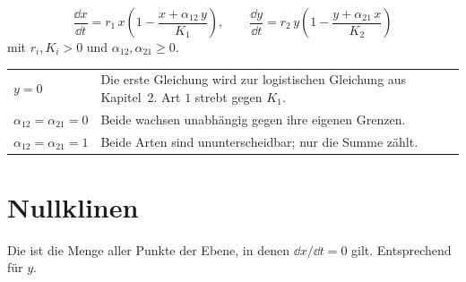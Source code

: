 \begin{definition}
\[ \frac{\dd x}{\dd t} = r_1\,x\left(1 - \frac{x + \alpha_{12}\,y}{K_1}\right), \qquad \frac{\dd y}{\dd t} = r_2\,y\left(1 - \frac{y + \alpha_{21}\,x}{K_2}\right) \]
mit $r_i, K_i > 0$ und $\alpha_{12}, \alpha_{21} \ge 0$.
\end{definition}

\begin{merksatz}
\begin{center}
{\small
\renewcommand{\arraystretch}{1.5}
\begin{tabular}{@{}P{2.6cm}P{6.0cm}@{}}
\toprule
$y = 0$ & Die erste Gleichung wird zur logistischen Gleichung aus Kapitel~2. Art $1$ strebt gegen $K_1$.\\
$\alpha_{12} = \alpha_{21} = 0$ & Beide wachsen unabhängig gegen ihre eigenen Grenzen.\\
$\alpha_{12} = \alpha_{21} = 1$ & Beide Arten sind ununterscheidbar; nur die Summe zählt.\\
\bottomrule
\end{tabular}}
\end{center}

\begin{center}
\begin{minipage}{0.88\textwidth}
\end{minipage}
\end{center}
\end{merksatz}

\section{Nullklinen}

\begin{definition}
Die  ist die Menge aller Punkte der Ebene, in denen $\dd x/\dd t = 0$ gilt. Entsprechend für $y$.
\end{definition}

